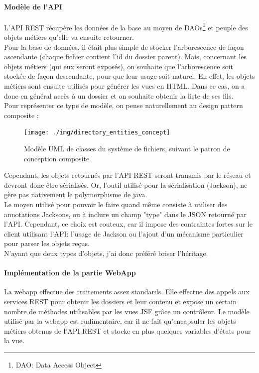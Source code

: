 \paragraph*{Modèle de l'API\\}
L'API REST récupère les données de la base au moyen de DAOs\footnote{DAO: Data Access Object} et peuple des objets métiers qu'elle va ensuite retourner.\\

Pour la base de données, il était plus simple de stocker l'arborescence de façon ascendante (chaque fichier contient l'id du dossier parent). Mais, concernant les objets métiers (qui eux seront exposés), on souhaite que l'arborescence soit stockée de façon descendante, pour que leur usage soit naturel.
En effet, les objets métiers sont ensuite utilisés pour générer les vues en HTML. Dans ce cas, on a donc en général accès à un dossier et on souhaite obtenir la liste de ses fils. \\

Pour représenter ce type de modèle, on pense naturellement au design pattern composite \cite{bib:compositePattern} : \\
\begin{figure}[H]
  \centering
  \texttt{[image: ./img/directory\_entities\_concept]}
  \caption{\label{fig:mb_va_ast} Modèle UML de classes du système de fichiers, suivant le patron de conception composite.}
\end{figure}

Cependant, les objets retournés par l'API REST seront transmis par le réseau et devront donc être sérialisés. Or, l'outil utilisé pour la sérialisation (Jackson), ne gère pas nativement le polymorphisme de java. \\
Le moyen utilisé pour pouvoir le faire quand même consiste à utiliser des annotations Jacksons, ou à inclure un champ "type" dans le JSON retourné par l'API. Cependant, ce choix est couteux, car il impose des contraintes fortes sur le client utilisant l'API: l'usage de Jackson ou l'ajout d'un mécanisme particulier pour parser les objets reçus.\\

N'ayant que deux types d'objets, j'ai donc préféré briser l'héritage.


\paragraph*{Implémentation de la partie WebApp\\}
La webapp effectue des traitements assez standards. Elle effectue des appels aux services REST pour obtenir les dossiers et leur contenu et expose un certain nombre de méthodes utilisables par les vues JSF grâce un contrôleur.
Le modèle utilisé par la webapp est rudimentaire, car il ne fait qu'encapsuler les objets métiers obtenus de l'API REST et stocke en plus quelques variables d'états pour la vue.

